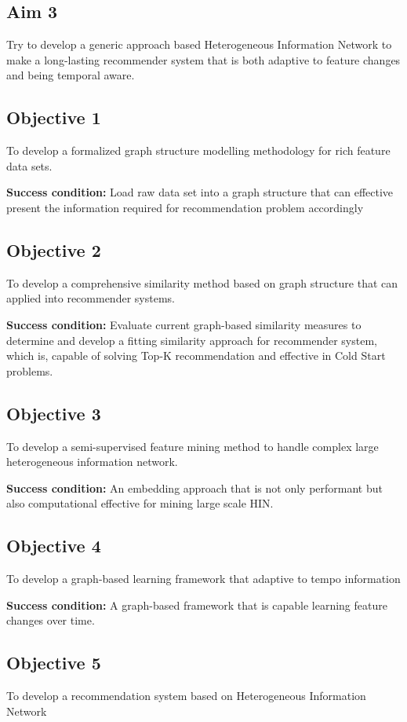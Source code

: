 \documentclass[12pt,a4 paper,title page]{article}
\theoremstyle{definition}
\begin{document}
\subsection*{Aim 3}
Try to develop a generic approach based Heterogeneous Information Network to make a long-lasting recommender system that is both adaptive to feature changes and being temporal aware. 

\subsection*{Objective 1}
To develop a formalized graph structure modelling methodology for rich feature data sets. 

\textbf{Success condition:} Load raw data set into a graph structure that can effective present the information required for recommendation problem accordingly 

\subsection*{Objective 2} 
To develop a comprehensive similarity method based on graph structure that can applied into recommender systems. 

\textbf{Success condition:} Evaluate current graph-based similarity measures to determine and develop a fitting similarity approach for recommender system, which is, capable of solving Top-K recommendation and effective in Cold Start problems. 

\subsection*{Objective 3}
To develop a semi-supervised feature mining method to handle complex large heterogeneous information network. 

\textbf{Success condition:} An embedding approach that is not only performant but also computational effective for mining large scale HIN. 

\subsection*{Objective 4} 
To develop a graph-based learning framework that adaptive to tempo information 

\textbf{Success condition:} A graph-based framework that is capable learning feature changes over time. 

\subsection*{Objective 5} 
To develop a recommendation system based on Heterogeneous Information Network 
\end{document}
